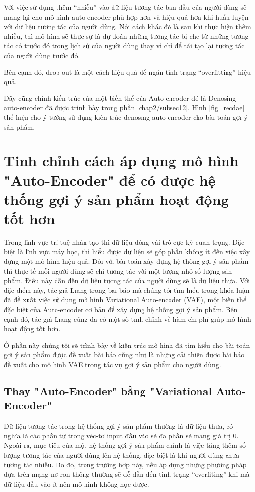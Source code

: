     Với việc sử dụng thêm ``nhiễu'' vào dữ liệu tương tác ban đầu của người dùng sẽ mang lại cho mô hình auto-encoder phù hợp hơn và hiệu quả hơn khi huấn luyện với dữ liệu tương tác của người dùng.
    Nói cách khác đó là sau khi thực hiện thêm nhiễu, thì mô hình sẽ thực sự là dự đoán những tương tác bị che từ những tương tác có trước đó trong lịch sử của người dùng thay vì chỉ để tái tạo lại tương tác của người dùng trước đó.

    Bên cạnh đó, drop out là một cách hiệu quả để ngăn tình trạng ``overfitting'' hiệu quả.

    Đây cũng chính kiến trúc của một biến thể của Auto-encoder đó là Denosing auto-encoder đã được trình bày trong phần \ref{chap2/subsec12}.
    Hình \ref{fig_recdae} thể hiện cho ý tưởng sử dụng kiến trúc denosing auto-encoder cho bài toán gợi ý sản phẩm.     

    

\section{Tinh chỉnh cách áp dụng mô hình "Auto-Encoder" để có được hệ thống gợi ý sản phẩm hoạt động tốt hơn}
    Trong lĩnh vực trí tuệ nhân tạo thì dữ liệu đóng vài trò cực kỳ quan trọng.
    Đặc biệt là lĩnh vực máy học, thì hiểu được dữ liệu sẽ góp phần không ít đến việc xây dựng một mô hình hiệu quả. 
    Đối với bài toán xây dựng hệ thống gợi ý sản phẩm thì thực tế mỗi người dùng sẽ chỉ tương tác với một lượng nhỏ số lượng sản phẩm.
    Điều này dẫn đến dữ liệu tương tác của người dùng sẽ là dữ liệu thưa.
    Với đặc điểm này, tác giả Liang trong bài báo \cite{mvae} mà chúng tôi tìm hiểu trong khóa luận đã đề xuất việc sử dụng mô hình Variational Auto-encoder (VAE), một biến thể đặc biệt của Auto-encoder cơ bản để xây dựng hệ thống gợi ý sản phẩm. 
    Bên cạnh đó, tác giả Liang cũng đã có một số tinh chỉnh về hàm chi phí giúp mô hình hoạt động tốt hơn.

    Ở phần này chúng tôi sẽ trình bày về kiến trúc mô hình đã tìm hiểu cho bài toán gợi ý sản phẩm được đề xuất bài báo cũng như là những cải thiện được bài báo đề xuất cho mô hình VAE trong tác vụ gợi ý sản phẩm cho người dùng. 

    \subsection{Thay "Auto-Encoder" bằng "Variational Auto-Encoder"}
    
    Dữ liệu tương tác trong hệ thống gợi ý sản phẩm thường là dữ liệu thưa, có nghĩa là các phần tử trong véc-tơ input đầu vào sẽ đa phần sẽ mang giá trị 0. 
    Ngoài ra, mục tiêu của một hệ thống gợi ý sản phẩm chính là việc tăng thêm số lượng tương tác của người dùng lên hệ thống, đặc biệt là khi người dùng chưa tương tác nhiều.
    Do đó, trong trường hợp này, nếu áp dụng những phương pháp dựa trên mạng nơ-ron thông thường sẽ dễ dẫn đến tình trạng ``overfiting'' khi mà dữ liệu đầu vào ít nên mô hình không học được.
    
